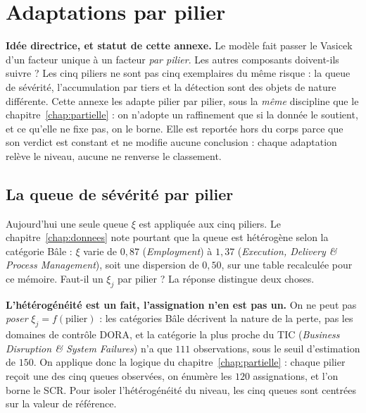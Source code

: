 \chapter{Adaptations par pilier}
\label{chap:adaptations}

\begin{cle}
\textbf{Idée directrice, et statut de cette annexe.} Le modèle fait passer le Vasicek d'un
facteur unique à un facteur \emph{par pilier}. Les autres composants doivent-ils suivre ? Les
cinq piliers ne sont pas cinq exemplaires du même risque : la queue de sévérité,
l'accumulation par tiers et la détection sont des objets de nature différente. Cette annexe
les adapte pilier par pilier, sous la \emph{même} discipline que le
chapitre~\ref{chap:partielle} : on n'adopte un raffinement que si la donnée le soutient, et
ce qu'elle ne fixe pas, on le borne. Elle est reportée hors du corps parce que son
verdict est constant et ne modifie aucune conclusion : chaque adaptation relève le
niveau, aucune ne renverse le classement.
\end{cle}

\section{La queue de sévérité par pilier}
\label{sec:xi-pilier}

Aujourd'hui une seule queue $\xi$ est appliquée aux cinq piliers. Le
chapitre~\ref{chap:donnees} note pourtant que la queue est hétérogène selon la catégorie
Bâle : $\xi$ varie de $0{,}87$ (\emph{Employment}) à $1{,}37$ (\emph{Execution, Delivery \&
Process Management}), soit une dispersion de $0{,}50$, sur une table recalculée pour ce mémoire.
Faut-il un $\xi_j$ par pilier ? La réponse distingue deux choses.

\begin{attention}
\textbf{L'hétérogénéité est un fait, l'assignation n'en est pas un.} On ne peut pas
\emph{poser} $\xi_j = f(\text{pilier})$ : les catégories Bâle décrivent la nature de la
perte, pas les domaines de contrôle DORA, et la catégorie la plus proche du TIC
(\emph{Business Disruption \& System Failures}) n'a que $111$ observations, sous le seuil
d'estimation de $150$. On applique donc la logique du chapitre~\ref{chap:partielle} : chaque pilier
reçoit une des cinq queues observées, on énumère les $120$ assignations, et l'on borne le
SCR. Pour isoler l'hétérogénéité du niveau, les cinq queues sont centrées sur la valeur de
référence.
\end{attention}

